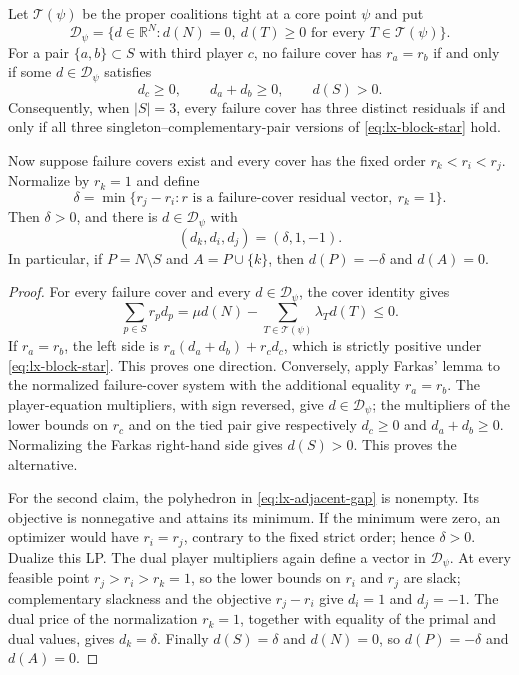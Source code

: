 \begin{lemma}
\label{lem:lx-three-player-block-star}
Let $\mathcal T(\psi)$ be the proper coalitions tight at a core point $\psi$
and put
\[
 \mathcal D_\psi=\{d\in\mathbb R^N:d(N)=0,\ d(T)\geq0
       \text{ for every }T\in\mathcal T(\psi)\}.
\]
For a pair $\{a,b\}\subset S$ with third player $c$, no failure cover has
$r_a=r_b$ if and only if some $d\in\mathcal D_\psi$ satisfies
\[
 d_c\geq0,\qquad d_a+d_b\geq0,\qquad d(S)>0.       \tag{BS}
 \label{eq:lx-block-star}
\]
Consequently, when $|S|=3$, every failure cover has three distinct residuals
if and only if all three singleton--complementary-pair versions of
\eqref{eq:lx-block-star} hold.

Now suppose failure covers exist and every cover has the fixed order
$r_k<r_i<r_j$.  Normalize by
$r_k=1$ and define
\[
 \delta=\min\{r_j-r_i:r\text{ is a failure-cover residual vector},\ r_k=1\}.
 \tag{AG}\label{eq:lx-adjacent-gap}
\]
Then $\delta>0$, and there is $d\in\mathcal D_\psi$ with
\[
 (d_k,d_i,d_j)=(\delta,1,-1).
 \tag{GD}\label{eq:lx-gap-direction}
\]
In particular, if $P=N\setminus S$ and $A=P\cup\{k\}$, then
$d(P)=-\delta$ and $d(A)=0$.
\end{lemma}

\begin{proof}
For every failure cover and every $d\in\mathcal D_\psi$, the cover identity
gives
\[
 \sum_{p\in S}r_pd_p
 =\mu d(N)-\sum_{T\in\mathcal T(\psi)}\lambda_Td(T)\leq0. \tag{P}
 \label{eq:lx-cover-tangent-pairing}
\]
If $r_a=r_b$, the left side is
$r_a(d_a+d_b)+r_cd_c$, which is strictly positive under
\eqref{eq:lx-block-star}.  This proves one direction.  Conversely, apply
Farkas' lemma to the normalized failure-cover system with the additional
equality $r_a=r_b$.  The player-equation multipliers, with sign reversed,
give $d\in\mathcal D_\psi$; the multipliers of the lower bounds on $r_c$ and
on the tied pair give respectively $d_c\geq0$ and $d_a+d_b\geq0$.  Normalizing
the Farkas right-hand side gives $d(S)>0$.  This proves the alternative.

For the second claim, the polyhedron in \eqref{eq:lx-adjacent-gap} is nonempty.
Its objective is nonnegative and attains its minimum.  If the minimum were
zero, an optimizer would have $r_i=r_j$, contrary to the fixed strict order;
hence $\delta>0$.  Dualize this LP.  The dual player multipliers again define
a vector in $\mathcal D_\psi$.  At every feasible point
$r_j>r_i>r_k=1$, so the lower bounds on $r_i$ and $r_j$ are slack; complementary
slackness and the objective $r_j-r_i$ give $d_i=1$ and $d_j=-1$.
The dual price of the normalization $r_k=1$, together with equality of the
primal and dual values, gives $d_k=\delta$.  Finally
$d(S)=\delta$ and $d(N)=0$, so $d(P)=-\delta$ and $d(A)=0$.
\end{proof}

